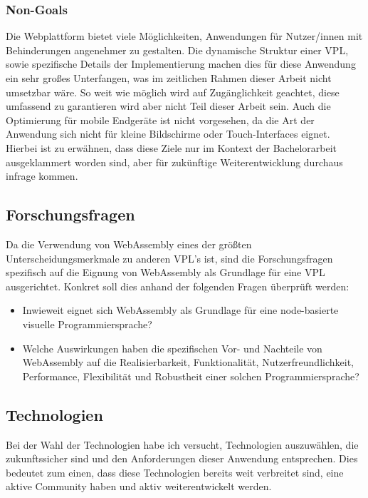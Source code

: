 \documentclass[ngerman]{article}
\begin{document}
\subsubsection{Non-Goals}
Die Webplattform bietet viele Möglichkeiten, Anwendungen für Nutzer/innen mit Behinderungen angenehmer zu gestalten. 
Die dynamische Struktur einer VPL, sowie spezifische Details der Implementierung machen dies für diese Anwendung ein sehr großes Unterfangen, was im zeitlichen Rahmen dieser Arbeit nicht umsetzbar wäre. So weit wie möglich wird auf Zugänglichkeit geachtet, diese umfassend zu garantieren wird aber nicht Teil dieser Arbeit sein.
\br
Auch die Optimierung für mobile Endgeräte ist nicht vorgesehen, da die Art der Anwendung sich nicht für kleine Bildschirme oder Touch-Interfaces eignet.
\br
Hierbei ist zu erwähnen, dass diese Ziele nur im Kontext der Bachelorarbeit ausgeklammert worden sind, aber für zukünftige Weiterentwicklung durchaus infrage kommen.

\subsection{Forschungsfragen}
Da die Verwendung von WebAssembly eines der größten Unterscheidungsmerkmale zu anderen VPL's ist, sind die Forschungsfragen spezifisch auf die Eignung von WebAssembly als Grundlage für eine VPL ausgerichtet. Konkret soll dies anhand der folgenden Fragen überprüft werden:
\begin{itemize}
  \item Inwieweit eignet sich WebAssembly als Grundlage für eine node-basierte visuelle Programmiersprache?  
  \item Welche Auswirkungen haben die spezifischen Vor- und Nachteile von WebAssembly auf die Realisierbarkeit, Funktionalität, Nutzerfreundlichkeit, Performance, Flexibilität und Robustheit einer solchen Programmiersprache?
\end{itemize}

\pagebreak

\subsection{Technologien}

Bei der Wahl der Technologien habe ich versucht, Technologien auszuwählen, die zukunftssicher sind und den Anforderungen dieser Anwendung entsprechen. Dies bedeutet zum einen, dass diese Technologien bereits weit verbreitet sind, eine aktive Community haben und aktiv weiterentwickelt werden.
\end{document}
